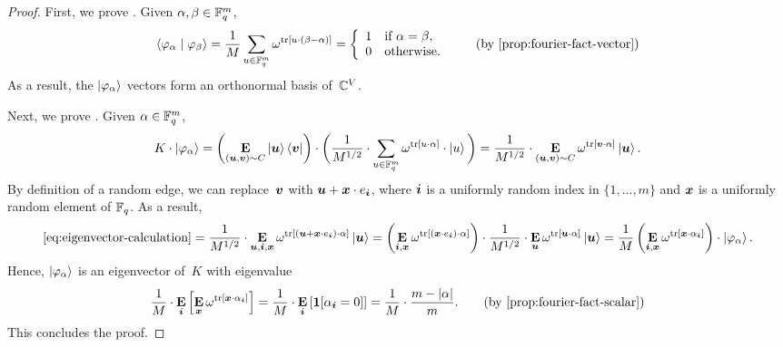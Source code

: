 \begin{proof}
First, we prove .
Given $\alpha, \beta \in \mathbb F_q^m$,
\begin{equation*}
\braket{\varphi_\alpha \mid \varphi_\beta}
= \frac{1}{M} \sum_{u \in \F_q^m} \omega^{\mathrm{tr}[u \cdot (\beta-\alpha)]}
= \left\{\begin{array}{rl}
	1 & \text{if } \alpha = \beta,\\
	0 & \text{otherwise}.
	\end{array} \right.\tag{by~\Cref{prop:fourier-fact-vector}}
\end{equation*}
As a result, the $\ket{\varphi_\alpha}$ vectors form an orthonormal basis of~$\mathbb C^V$.

Next, we prove .
Given $\alpha \in \mathbb F_q^m$,
\begin{equation}\label{eq:eigenvector-calculation}
K \cdot \ket{\varphi_\alpha}
= \left(\mathop{\bf E\/}_{(\boldsymbol{u}, \boldsymbol{v}) \sim C} \ket{\boldsymbol{u}}\bra{\boldsymbol{v}}\right) \cdot \bigg(\frac{1}{M^{1/2}} \cdot \sum_{u \in \mathbb F_q^m} \omega^{\mathrm{tr}[u \cdot \alpha]}\cdot \ket{u}\bigg)\\
= \frac{1}{M^{1/2}} \cdot \mathop{\bf E\/}_{(\boldsymbol{u}, \boldsymbol{v}) \sim C} \omega^{\mathrm{tr}[\boldsymbol{v} \cdot \alpha]} \ket{\boldsymbol{u}}.
\end{equation}
By definition of a random edge,
we can replace~$\boldsymbol{v}$ with $\boldsymbol{u} + {\boldsymbol{x}} \cdot e_{\boldsymbol{i}}$, where $\boldsymbol{i}$ is a uniformly random index in $\{1, \ldots, m\}$ and ${\boldsymbol{x}}$ is a uniformly random element of $\mathbb F_q$.
As a result,
\begin{equation*}
\eqref{eq:eigenvector-calculation} 
= \frac{1}{M^{1/2}} \cdot \mathop{\bf E\/}_{\boldsymbol{u},\boldsymbol{i}, {\boldsymbol{x}}} \omega^{\mathrm{tr}[(\boldsymbol{u} + {\boldsymbol{x}} \cdot e_{\boldsymbol{i}}) \cdot \alpha]} \ket{\boldsymbol{u}}
= \left(\mathop{\bf E\/}_{\boldsymbol{i}, {\boldsymbol{x}}}\omega^{\mathrm{tr}[({\boldsymbol{x}} \cdot e_{\boldsymbol{i}}) \cdot \alpha]}\right)  \cdot \frac{1}{M^{1/2}} \cdot \mathop{\bf E\/}_{\boldsymbol{u}} \omega^{\mathrm{tr}[\boldsymbol{u} \cdot \alpha]} \ket{\boldsymbol{u}}
= \frac{1}{M}\left(\mathop{\bf E\/}_{\boldsymbol{i}, {\boldsymbol{x}}}\omega^{\mathrm{tr}[{\boldsymbol{x}} \cdot \alpha_{\boldsymbol{i}}]}\right)  \cdot \ket{\varphi_\alpha}.
\end{equation*}
Hence, $\ket{\varphi_\alpha}$ is an eigenvector of~$K$ with eigenvalue
\begin{equation*}
\frac{1}{M} \cdot \E_{\bi} \left[\E_{\bx}\omega^{\mathrm{tr}[\bx \cdot \alpha_{\bi}]}\right]
= \frac{1}{M} \cdot \E_{\bi} \left[\bone[\alpha_{\bi} = 0]\right]
= \frac{1}{M} \cdot  \frac{m - |\alpha|}{m}. \tag{by~\Cref{prop:fourier-fact-scalar}}
\end{equation*}
This concludes the proof.
\end{proof}

